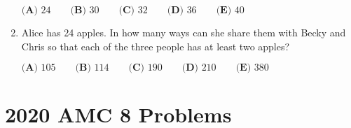 \documentclass{article}
\begin{document}
\begin{enumerate}[label=\arabic*., itemsep=0.5em]
\(\textbf{(A) }24\qquad\textbf{(B) }30\qquad\textbf{(C) }32\qquad\textbf{(D) }36\qquad\textbf{(E) }40\)\par \vspace{0.5em}\item Alice has 24 apples. In how many ways can she share them with Becky and
Chris so that each of the three people has at least two apples?

\(\textbf{(A) }105\qquad\textbf{(B) }114\qquad\textbf{(C) }190\qquad\textbf{(D) }210\qquad\textbf{(E) }380\)\par \vspace{0.5em}
\end{enumerate}
\newpage\section*{2020 AMC 8 Problems}
\end{document}

